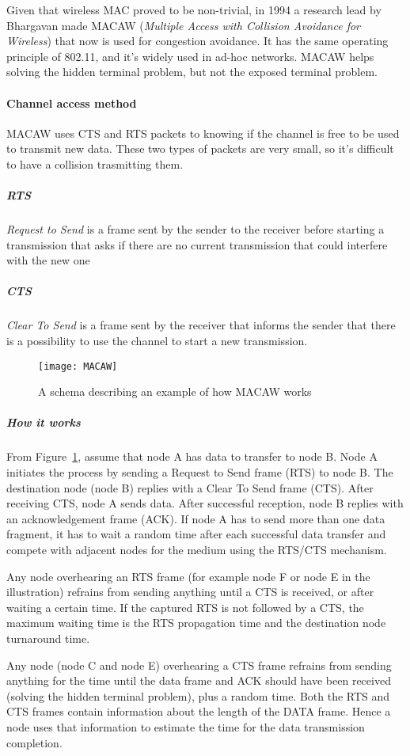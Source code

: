 Given that wireless MAC proved to be non-trivial, in 1994 a research lead by
Bhargavan made MACAW (\textit{Multiple Access with Collision Avoidance for
  Wireless}) that now is used for congestion avoidance. It has the same
operating principle of 802.11, and it's widely used in ad-hoc networks.
MACAW helps solving the hidden terminal problem, but not the exposed terminal
problem.

\paragraph*{Channel access method}
MACAW uses CTS and RTS packets to knowing if the channel is free to be used to
transmit new data. These two types of packets are very small, so it's difficult
to have a collision trasmitting them.

\subparagraph*{RTS} \textit{Request to Send} is a frame sent by the
sender to the receiver before starting a transmission that asks if there are no
current transmission that could interfere with the new one

\subparagraph*{CTS} \textit{Clear To Send} is a frame sent by the receiver
that informs the sender that there is a possibility to use the channel to start
a new transmission.

\begin{figure}[t]
  \centering
  \texttt{[image: MACAW]}
  \caption{A schema describing an example of how MACAW works}
  \label{fig:mac:macaw}
\end{figure}

\subparagraph*{How it works} From Figure~\ref{fig:mac:macaw}, assume that node A
has data to transfer to node B.
Node A initiates the process by sending a Request to Send frame (RTS) to node B.
The destination node (node B) replies with a Clear To Send frame (CTS). After
receiving CTS, node A sends data. After successful reception, node B replies
with an acknowledgement frame (ACK). If node A has to send more than one data
fragment, it has to wait a random time after each successful data transfer and
compete with adjacent nodes for the medium using the RTS/CTS mechanism.

Any node overhearing an RTS frame (for example node F or node E in the
illustration) refrains from sending anything until a CTS is received, or after
waiting a certain time. If the captured RTS is not followed by a CTS, the
maximum waiting time is the RTS propagation time and the destination node
turnaround time.

Any node (node C and node E) overhearing a CTS frame refrains from sending
anything for the time until the data frame and ACK should have been received
(solving the hidden terminal problem), plus a random time. Both the RTS and CTS
frames contain information about the length of the DATA frame. Hence a node uses
 that information to estimate the time for the data transmission completion.


